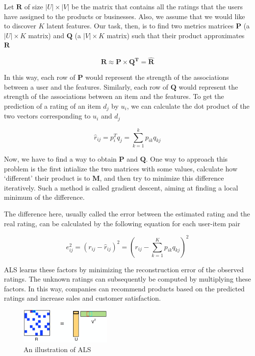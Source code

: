 \documentclass[conference]{IEEEtran}
\begin{document}
Let $\boldsymbol{R}$ of size $|U| \times |V|$ be the matrix that contains all the ratings that the users have assigned to the products or businesses. Also, we assume that we would like to discover $K$ latent features. Our task, then, is to find two metrics matrices $\boldsymbol{P}$ (a $|U| \times K$ matrix) and $\boldsymbol{Q}$ (a $|V| \times K$ matrix) such that their product approximates $\boldsymbol{R}$

$$ \boldsymbol{R \approx P \times Q^T = \hat{R}} $$

In this way, each row of $\boldsymbol{P}$ would represent the strength of the associations between a user and the features. Similarly, each row of $\boldsymbol{Q}$ would represent the strength of the associations between an item and the features. To get the prediction of a rating of an item $d_j$ by $u_i$, we can calculate the dot product of the two vectors corresponding to $u_i$ and $d_j$

$$ \hat{r}_{ij} = p^T_i q_j = \sum_{k=1}^{k}p_{ik} q_{kj} $$

Now, we have to find a way to obtain $\boldsymbol{P}$ and $\boldsymbol{Q}$. One way to approach this problem is the first intialize the two matrices with some values, calculate how `different’ their product is to $\boldsymbol{M}$, and then try to minimize this difference iteratively. Such a method is called gradient descent, aiming at finding a local minimum of the difference.

The difference here, usually called the error between the estimated rating and the real rating, can be calculated by the following equation for each user-item pair

$$ e^2_{ij} = (r_{ij} - \hat{r}_{ij})^2 = (r_{ij} - \sum_{k=1}^{K}p_{ik} q_{kj})^2 $$

ALS learns these factors by minimizing the reconstruction error of the observed ratings. The unknown ratings can subsequently be computed by multiplying these factors. In this way, companies can recommend products based on the predicted ratings and increase sales and customer satisfaction.


\begin{figure}[h]
\centering
\includegraphics[width=0.4\textwidth]{image/als-illustration.png}
\caption{An illustration of ALS}
\end{figure}
\end{document}
